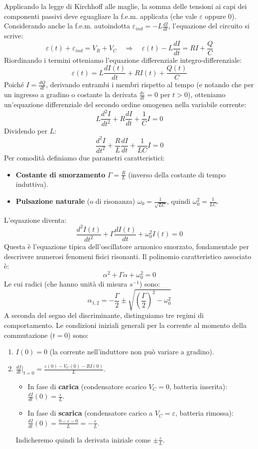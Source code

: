 \documentclass{book}
\begin{document}
Applicando la legge di Kirchhoff alle maglie, la somma delle tensioni ai capi dei componenti passivi deve eguagliare la f.e.m. applicata (che vale $\varepsilon$ oppure $0$). Considerando anche la f.e.m. autoindotta $\varepsilon_{ind} = -L \frac{dI}{dt}$, l'equazione del circuito si scrive:
$$
\varepsilon(t) + \varepsilon_{ind} = V_R + V_C \quad \Rightarrow \quad \varepsilon(t) - L \frac{dI}{dt} = RI + \frac{Q}{C}
$$
Riordinando i termini otteniamo l'equazione differenziale integro-differenziale:
$$
\varepsilon(t) = L \frac{dI(t)}{dt} + R I(t) + \frac{Q(t)}{C}
$$
Poiché $I = \frac{dQ}{dt}$, derivando entrambi i membri rispetto al tempo (e notando che per un ingresso a gradino o costante la derivata $\frac{d\varepsilon}{dt} = 0$ per $t>0$), otteniamo un'equazione differenziale del secondo ordine omogenea nella variabile corrente:
$$
L \frac{d^2 I}{dt^2} + R \frac{dI}{dt} + \frac{1}{C} I = 0
$$
Dividendo per $L$:
$$
\frac{d^2 I}{dt^2} + \frac{R}{L} \frac{dI}{dt} + \frac{1}{LC} I = 0
$$
Per comodità definiamo due parametri caratteristici:
\begin{itemize}
    \item \textbf{Costante di smorzamento} $\Gamma = \frac{R}{L}$ (inverso della costante di tempo induttiva).
    \item \textbf{Pulsazione naturale} (o di risonanza) $\omega_0 = \frac{1}{\sqrt{LC}}$, quindi $\omega_0^2 = \frac{1}{LC}$.
\end{itemize}
L'equazione diventa:
$$
\frac{d^2 I(t)}{dt^2} + \Gamma \frac{dI(t)}{dt} + \omega_0^2 I(t) = 0
$$
Questa è l'equazione tipica dell'oscillatore armonico smorzato, fondamentale per descrivere numerosi fenomeni fisici risonanti.
Il polinomio caratteristico associato è:
$$
\alpha^2 + \Gamma \alpha + \omega_0^2 = 0
$$
Le cui radici (che hanno unità di misura $s^{-1}$) sono:
$$
\alpha_{1,2} = -\frac{\Gamma}{2} \pm \sqrt{\left(\frac{\Gamma}{2}\right)^2 - \omega_0^2}
$$
A seconda del segno del discriminante, distinguiamo tre regimi di comportamento.
Le condizioni iniziali generali per la corrente al momento della commutazione ($t=0$) sono:
\begin{enumerate}
    \item $I(0) = 0$ (la corrente nell'induttore non può variare a gradino).
    \item $\frac{dI}{dt}\big|_{t=0} = \frac{\varepsilon(0) - V_C(0) - RI(0)}{L}$.
    \begin{itemize}
        \item In fase di \textbf{carica} (condensatore scarico $V_C=0$, batteria inserita): $\frac{dI}{dt}(0) = \frac{\varepsilon}{L}$.
        \item In fase di \textbf{scarica} (condensatore carico a $V_C=\varepsilon$, batteria rimossa): $\frac{dI}{dt}(0) = \frac{0 - \varepsilon - 0}{L} = -\frac{\varepsilon}{L}$.
    \end{itemize}
    Indicheremo quindi la derivata iniziale come $\pm \frac{\varepsilon}{L}$.
\end{enumerate}
\end{document}
